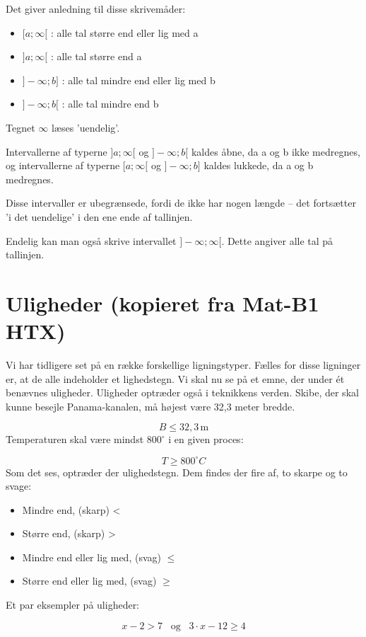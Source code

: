 \documentclass[12pt,oneside,a4paper]{article}
\begin{document}
Det giver anledning til disse skrivemåder:

\begin{itemize}
    \item $[a;\infty[$  : alle tal større end eller lig med a
    \item $]a;\infty[$  : alle tal større end a
    \item $]-\infty;b]$ : alle tal mindre end eller lig med b
    \item $]-\infty;b[$ : alle tal mindre end b
\end{itemize}
Tegnet $\infty$ læses ’uendelig’.

Intervallerne af typerne $]a;\infty [$ og $]-\infty ;b[$ kaldes åbne, da a og b
ikke medregnes, og intervallerne af typerne $[a;\infty [$ og $]-\infty ;b]$
kaldes lukkede, da a og b medregnes.

Disse intervaller er ubegrænsede, fordi de ikke har nogen længde – det
fortsætter ’i det uendelige’ i den ene ende af tallinjen.

Endelig kan man også skrive intervallet $]-\infty ;\infty [$. Dette angiver
alle tal på tallinjen.

\section{Uligheder (kopieret fra Mat-B1 HTX)}
Vi har tidligere set på en række forskellige ligningstyper. Fælles for disse
ligninger er, at de alle indeholder et lighedstegn. Vi skal nu se på et emne,
der under ét benævnes uligheder. Uligheder optræder også i teknikkens verden.
Skibe, der skal kunne besejle Panama-kanalen, må højest være 32,3 meter bredde.

$$
B\leq 32,3 \, \text{m}
$$
Temperaturen skal være mindst $800^\circ$ i en given proces:


$$
T \geq 800 ^\circ C
$$
Som det ses, optræder der ulighedstegn. Dem findes der fire af, to skarpe og to svage:

\begin{itemize}
    \item Mindre end, (skarp) <
    \item Større end, (skarp) >
    \item Mindre end eller lig med, (svag) $\leq$
    \item Større end eller lig med, (svag) $\geq$
\end{itemize}

Et par eksempler på uligheder:

$$
x-2>7 \;\;\; \text{og} \;\;\; 3\cdot x-12\geq 4
$$
\end{document}
